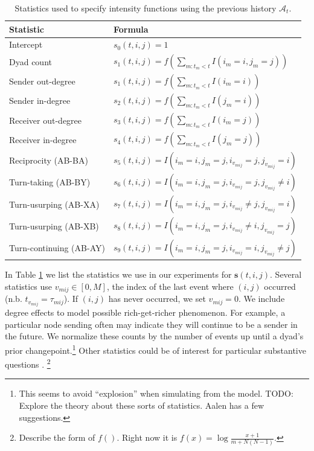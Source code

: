 \documentclass{article}
\begin{document}
\begin{table}[t]
\footnotesize
\center
\begin{tabular}{|l|l|}
\hline
Statistic & Formula \\
\hline
\hline
Intercept& $s_{0}(t,i,j) = 1$\\
Dyad count& $s_{1}(t,i,j) = f(\sum_{m:t_m<t} I(i_m=i,j_m=j) )$\\
Sender out-degree& $s_{1}(t,i,j) = f(\sum_{m:t_m<t} I(i_m=i) )$\\
Sender in-degree& $s_{2}(t,i,j) = f(\sum_{m:t_m<t} I(j_m=i) )$\\
Receiver out-degree& $s_{3}(t,i,j) = f(\sum_{m:t_m<t} I(i_m=j))$\\
Receiver in-degree& $s_{4}(t,i,j) = f(\sum_{m:t_m<t} I(j_m=j))$\\
Reciprocity (AB-BA)& $s_{5}(t,i,j) = I(i_m=i,j_m=j,i_{v_{mij}}=j,j_{v_{mij}}=i)$\\
Turn-taking (AB-BY)&$s_{6}(t,i,j) = I(i_m=i,j_m=j,i_{v_{mij}}=j,j_{v_{mij}}\ne i)$\\
Turn-usurping (AB-XA)& $s_{7}(t,i,j) = I(i_m=i,j_m=j,i_{v_{mij}} \ne j,j_{v_{mij}}=i)$\\
Turn-usurping (AB-XB)&$s_{8}(t,i,j) = I(i_m=i,j_m=j,i_{v_{mij}} \ne i,j_{v_{mij}}=j)$\\
Turn-continuing (AB-AY)& $s_{9}(t,i,j) =  I(i_m=i,j_m=j,i_{v_{mij}}=i,j_{v_{mij}}\ne j)$\\
\hline
\end{tabular}
\label{tab:stats}
\caption{Statistics used to specify intensity functions using the previous history $\mathcal{A}_t$.}
\end{table}



In Table \ref{tab:stats} we list the statistics we use in our experiments for  $\mathbf{s}(t,i,j)$.  Several statistics use $v_{mij} \in [0,M]$, the index of the last event where $(i,j)$ occurred (n.b. $t_{v_{mij}} = \tau_{mij}$). If $(i,j)$ has never occurred, we set $v_{mij}=0$.  We include degree effects to model possible rich-get-richer phenomenon.  For example, a particular node sending often may indicate they will continue to be a sender in the future.  We normalize these counts by the number of events up until a dyad's prior changepoint.\footnote{This seems to avoid ``explosion'' when simulating from the model.  TODO: Explore the theory about these sorts of statistics.  Aalen has a few suggestions.} Other statistics could be of interest for particular substantive questions \cite{Butts2008,Vu2011}.  \footnote{Describe the form of $f()$.  Right now it is $f(x) = \log \frac{x+1}{m + N(N-1)}$.}
\end{document}

